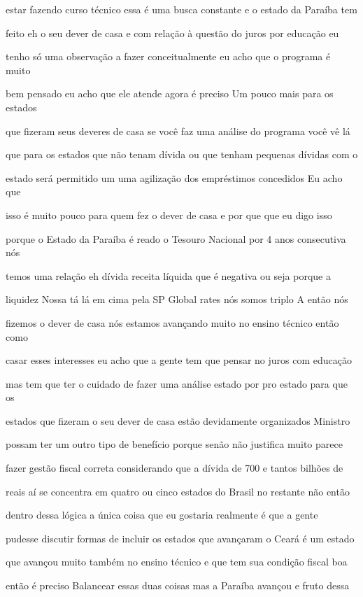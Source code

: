 \documentclass[a4paper,12pt]{article}
\begin{document}
estar fazendo curso técnico essa é uma busca constante e o estado da Paraíba tem

feito eh o seu dever de casa e com relação à questão do juros por educação eu

tenho só uma observação a fazer conceitualmente eu acho que o programa é muito

bem pensado eu acho que ele atende agora é preciso Um pouco mais para os estados

que fizeram seus deveres de casa se você faz uma análise do programa você vê lá

que para os estados que não tenam dívida ou que tenham pequenas dívidas com o

estado será permitido um uma agilização dos empréstimos concedidos Eu acho que

isso é muito pouco para quem fez o dever de casa e por que que eu digo isso

porque o Estado da Paraíba é reado o Tesouro Nacional por 4 anos consecutiva nós

temos uma relação eh dívida receita líquida que é negativa ou seja porque a

liquidez Nossa tá lá em cima pela SP Global rates nós somos triplo A então nós

fizemos o dever de casa nós estamos avançando muito no ensino técnico então como

casar esses interesses eu acho que a gente tem que pensar no juros com educação

mas tem que ter o cuidado de fazer uma análise estado por pro estado para que os

estados que fizeram o seu dever de casa estão devidamente organizados Ministro

possam ter um outro tipo de benefício porque senão não justifica muito parece

fazer gestão fiscal correta considerando que a dívida de 700 e tantos bilhões de

reais aí se concentra em quatro ou cinco estados do Brasil no restante não então

dentro dessa lógica a única coisa que eu gostaria realmente é que a gente

pudesse discutir formas de incluir os estados que avançaram o Ceará é um estado

que avançou muito também no ensino técnico e que tem sua condição fiscal boa

então é preciso Balancear essas duas coisas mas a Paraíba avançou e fruto dessa
\end{document}
